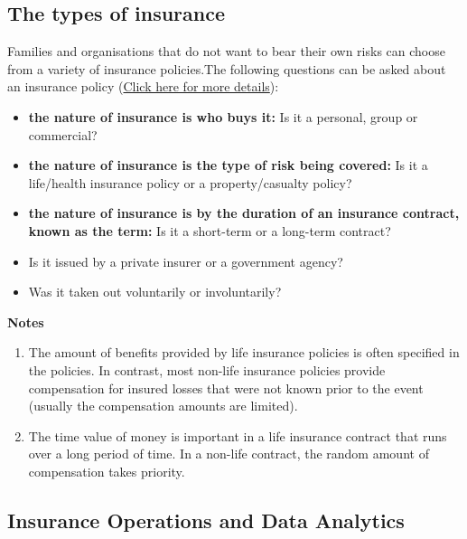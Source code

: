 \documentclass[landscape, 20pt]{extreport}
\theoremstyle{definition}
\theoremstyle{definition}
\theoremstyle{definition}
\theoremstyle{definition}
\theoremstyle{remark}
\begin{document}
\hypertarget{the-types-of-insurance}{%
\subsection{The types of insurance}\label{the-types-of-insurance}}

Families and organisations that do not want to bear their own risks can choose from a variety of insurance policies.The following questions can be asked about an insurance policy (\href{https://saylordotorg.github.io/text_risk-management-for-enterprises-and-individuals/s10-04-types-of-insurance-and-insurer.html}{Click here for more details}):

\begin{itemize}
\item
  \textbf{the nature of insurance is who buys it:} Is it a personal, group or commercial?
\item
  \textbf{the nature of insurance is the type of risk being covered:} Is it a life/health insurance policy or a property/casualty policy?
\item
  \textbf{the nature of insurance is by the duration of an insurance contract, known as the term:} Is it a short-term or a long-term contract?
\item
  Is it issued by a private insurer or a government agency?
\item
  Was it taken out voluntarily or involuntarily?
\end{itemize}

\textbf{Notes}

\begin{enumerate}
\def\labelenumi{\arabic{enumi}.}
\item
  The amount of benefits provided by life insurance policies is often specified in the policies. In contrast, most non-life insurance policies provide compensation for insured losses that were not known prior to the event (usually the compensation amounts are limited).
\item
  The time value of money is important in a life insurance contract that runs over a long period of time. In a non-life contract, the random amount of compensation takes priority.
\end{enumerate}

\hypertarget{insurance-operations-and-data-analytics}{%
\subsection{Insurance Operations and Data Analytics}\label{insurance-operations-and-data-analytics}}
\end{document}
